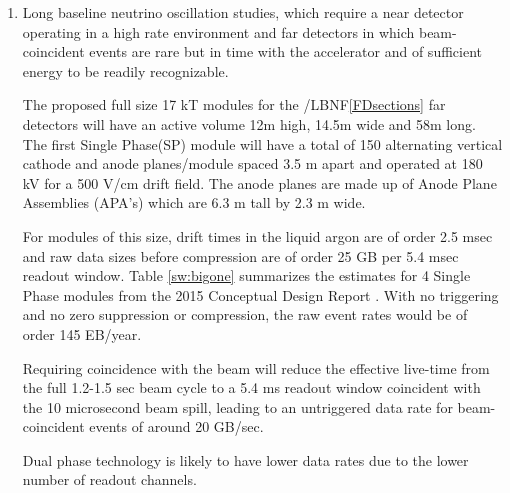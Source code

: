 \begin{enumerate}
\item Long baseline neutrino oscillation studies, which require a near detector operating in a high rate environment and far detectors in which beam-coincident events are rare but in time with the accelerator and of sufficient energy to be readily recognizable.  

The proposed  full size 17 kT modules for the  /LBNF\ref{FDsections} far detectors will  have an active volume 12m high, 14.5m wide and 58m long.  The first Single Phase(SP) module will have 
a total of 150 alternating vertical cathode and anode planes/module  spaced 3.5 m apart and operated at 180 kV for a 500 V/cm drift field.  The anode planes are made up of Anode Plane Assemblies  (APA's) which are 6.3 m tall by 2.3 m wide. %

For modules of this size, drift times in the liquid argon are of order 2.5 msec and raw data sizes before compression are of order 25 GB per 5.4 msec readout window. Table \ref{sw:bigone} summarizes the estimates for 4 Single Phase modules from the 2015 Conceptual Design Report \cite{cdr-annex-rates}.  With no triggering and no zero suppression or compression, the raw event rates would be of order 145 EB/year. 

Requiring  coincidence with the  beam will reduce the effective live-time from the full 1.2-1.5 sec beam cycle to a 5.4 ms readout window coincident with the 10 microsecond beam spill, leading to an untriggered data rate for beam-coincident events of around 20 GB/sec.

Dual phase technology is likely to have lower data rates due to the lower number of readout channels. 




\end{enumerate}
